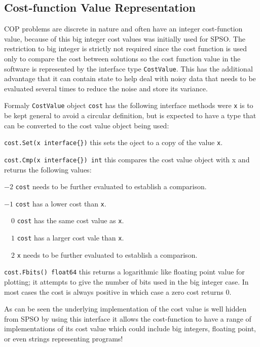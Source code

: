 \documentclass[a4paper,oneside,english]{article}
\numberwithin{equation}{section}
\numberwithin{figure}{section}
\begin{document}
\subsection{Cost-function Value Representation}   
COP problems are discrete in nature and often have an integer cost-function value, because of this big integer cost values was initially used for SPSO.  The restriction to big integer is strictly not required since the cost function is used only to compare the cost between solutions so the cost function value in the software is represented by the interface type \texttt{CostValue}. This has the additional advantage that it can contain state to help deal with noisy data that needs to be evaluated several times to reduce the noise and store its variance.

Formaly \texttt{CostValue} object \texttt{cost} has the following interface methods were \texttt{x} is to be kept general to avoid a circular definition, but is expected to  have a type that can be converted to the cost value object being used:
\begin{list}{}
	\item \texttt{cost.Set(x interface\{\})} this sets the oject to a copy of the value \texttt{x}. 
	\item \texttt{cost.Cmp(x interface\{\}) int} this compares the cost value object with x and returns the following values:
		\begin{list}{}
		\item $-2$ \texttt{cost} needs to be further evaluated to establish a comparison.
		\item $-1$ \texttt{cost} has a lower cost than \texttt{x}.
		\item $\quad 0$ \texttt{cost} has the same cost value as \texttt{x}.
		\item $\quad 1$ \texttt{cost} has a larger cost vale than \texttt{x}.
		\item $\quad 2$ \texttt{x} needs to be further evaluated to establish a comparison.
		\end{list}
	
	\item \texttt{cost.Fbits() float64} this returns a logarithmic like floating point value for plotting; it attempts to give the number of bits  used in the big integer case. In most cases the cost is always positive in which case a zero cost returns $0$.

\end{list}
As can be seen the underlying implementation of the cost value is well hidden from SPSO by using this interface it allows the cost-function to have a range of implementations  of its cost value which could include big integers, floating point, or even strings representing programs! 
\end{document}
